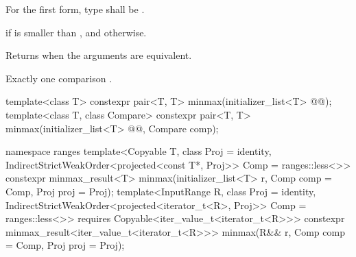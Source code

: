 \begin{itemdescr}
\pnum
\requires
For the first form, type  shall be
.

\pnum
\returns
{}
 if  is smaller
than , and
 otherwise.

\begin{removedblock}
\pnum
\remarks
Returns  when the arguments are equivalent.
\end{removedblock}

\pnum
\complexity
Exactly one comparison .
\end{itemdescr}


%
\begin{itemdecl}
template<class T>
  constexpr pair<T, T> minmax(initializer_list<T> @@);
template<class T, class Compare>
  constexpr pair<T, T> minmax(initializer_list<T> @@, Compare comp);
\end{itemdecl}
\begin{addedblock}
\begin{itemdecl}
namespace ranges {
  template<Copyable T, class Proj = identity,
      IndirectStrictWeakOrder<projected<const T*, Proj>> Comp = ranges::less<>>
    constexpr minmax_result<T>
      minmax(initializer_list<T> r, Comp comp = Comp{}, Proj proj = Proj{});
  template<InputRange R, class Proj = identity,
      IndirectStrictWeakOrder<projected<iterator_t<R>, Proj>> Comp = ranges::less<>>
    requires Copyable<iter_value_t<iterator_t<R>>>
    constexpr minmax_result<iter_value_t<iterator_t<R>>>
      minmax(R&& r, Comp comp = Comp{}, Proj proj = Proj{});
}
\end{itemdecl}
\end{addedblock}

